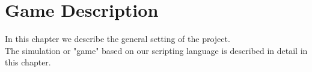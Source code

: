 \chapter{Game Description}
In this chapter we describe the general setting of the project. \\
The simulation or "game" based on our scripting language is described in detail in this chapter.